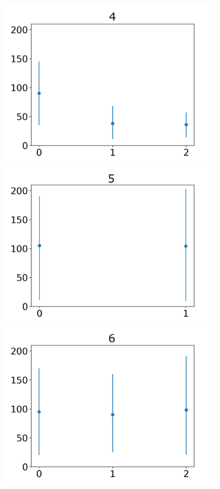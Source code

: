 \documentclass[journal]{IEEEtran}
\begin{document}
{{\begin{figure}[h!]
\begin{subfigure}{0.5\textwidth}
 \includegraphics[scale=0.27]{Images/Average_steps/d.png} 
 \centering
  \includegraphics[scale=0.27]{Images/Average_steps/e.png} 
  \includegraphics[scale=0.27]{Images/Average_steps/f.png} 

\end{subfigure}
\end{figure}}}
\end{document}
